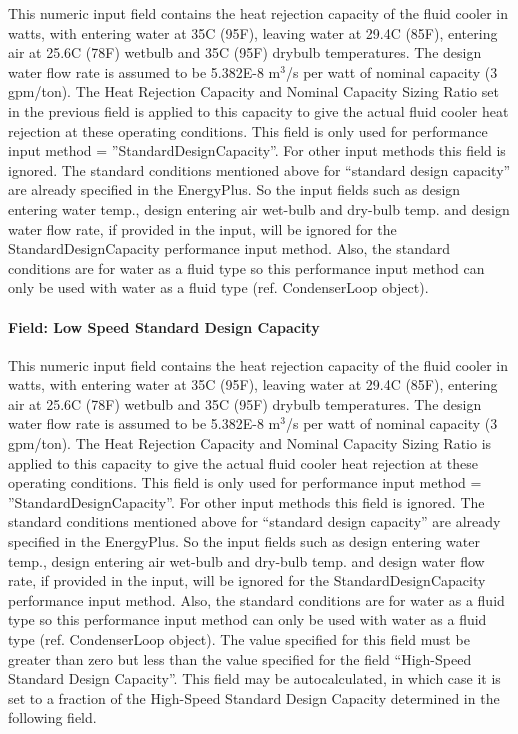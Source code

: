 This numeric input field contains the heat rejection capacity of the fluid cooler in watts, with entering water at 35C (95F), leaving water at 29.4C (85F), entering air at 25.6C (78F) wetbulb and 35C (95F) drybulb temperatures. The design water flow rate is assumed to be 5.382E-8 m\(^{3}\)/s per watt of nominal capacity (3 gpm/ton). The Heat Rejection Capacity and Nominal Capacity Sizing Ratio set in the previous field is applied to this capacity to give the actual fluid cooler heat rejection at these operating conditions. This field is only used for performance input method = ''StandardDesignCapacity''. For other input methods this field is ignored. The standard conditions mentioned above for ``standard design capacity'' are already specified in the EnergyPlus. So the input fields such as design entering water temp., design entering air wet-bulb and dry-bulb temp. and design water flow rate, if provided in the input, will be ignored for the StandardDesignCapacity performance input method. Also, the standard conditions are for water as a fluid type so this performance input method can only be used with water as a fluid type (ref. CondenserLoop object).

\paragraph{Field: Low Speed Standard Design Capacity}\label{field-low-speed-standard-design-capacity}

This numeric input field contains the heat rejection capacity of the fluid cooler in watts, with entering water at 35C (95F), leaving water at 29.4C (85F), entering air at 25.6C (78F) wetbulb and 35C (95F) drybulb temperatures. The design water flow rate is assumed to be 5.382E-8 m\(^{3}\)/s per watt of nominal capacity (3 gpm/ton). The Heat Rejection Capacity and Nominal Capacity Sizing Ratio is applied to this capacity to give the actual fluid cooler heat rejection at these operating conditions. This field is only used for performance input method = ''StandardDesignCapacity''. For other input methods this field is ignored. The standard conditions mentioned above for ``standard design capacity'' are already specified in the EnergyPlus. So the input fields such as design entering water temp., design entering air wet-bulb and dry-bulb temp. and design water flow rate, if provided in the input, will be ignored for the StandardDesignCapacity performance input method. Also, the standard conditions are for water as a fluid type so this performance input method can only be used with water as a fluid type (ref. CondenserLoop object). The value specified for this field must be greater than zero but less than the value specified for the field ``High-Speed Standard Design Capacity''. This field may be autocalculated, in which case it is set to a fraction of the High-Speed Standard Design Capacity determined in the following field.

